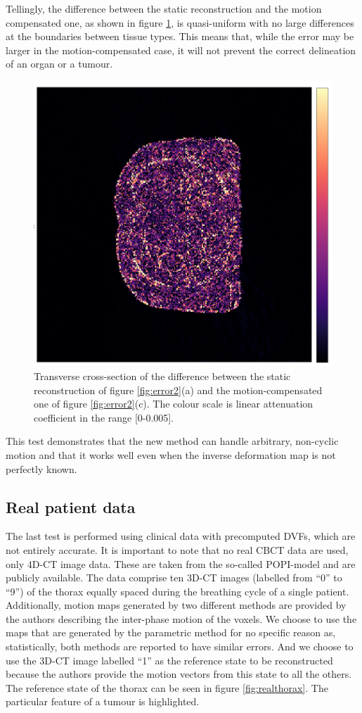 Tellingly, the difference between the static reconstruction and the motion compensated one, as shown in figure \ref{fig:error23}, is quasi-uniform with no large differences at the boundaries between tissue types.  This means that, while the error may be larger in the motion-compensated case, it will not prevent the correct delineation of an organ or a tumour.

\begin{figure}[ht]
\begin{center}
\includegraphics[width=0.6\linewidth]{MotionCorrection/motion2errorXCAT2.png} 
\end{center}
\caption[Error between SART and MC-SART]{\label{fig:error23} Transverse cross-section of the difference between the static reconstruction of figure \ref{fig:error2}(a) and the motion-compensated one of figure \ref{fig:error2}(c). The colour scale is linear attenuation coefficient in the range [0-0.005].} 
\end{figure}

This test demonstrates that the new method can handle arbitrary, non-cyclic motion and that it works well even when the inverse deformation map is not perfectly known.


\FloatBarrier
\subsection{Real patient data}

The last test is performed using clinical data with precomputed DVFs, which are not entirely accurate.  It is important to note that no real CBCT data are used, only 4D-CT image data.  These are taken from the so-called POPI-model\cite{vandemeulebroucke2007popi} and are publicly available\cite{popi-modelweb}.  The data comprise ten 3D-CT images (labelled from ``0'' to ``9'') of the thorax equally spaced during the breathing cycle of a single patient.  Additionally, motion maps generated by two different methods are provided by the authors describing the inter-phase motion of the voxels.  We choose to use the maps that are generated by the parametric method for no specific reason as, statistically, both methods are reported to have similar errors.  And we choose to use the 3D-CT image labelled ``1'' as the reference state to be reconstructed because the authors provide the motion vectors from this state to all the others.  The reference state of the thorax can be seen in figure \ref{fig:realthorax}.  The particular feature of a tumour is highlighted.

